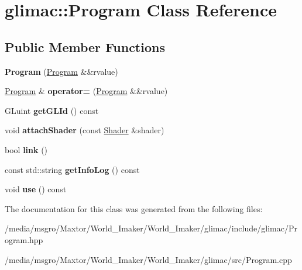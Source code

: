 \hypertarget{classglimac_1_1Program}{}\section{glimac\+:\+:Program Class Reference}
\label{classglimac_1_1Program}
\subsection*{Public Member Functions}
\begin{DoxyCompactItemize}
\item 
\mbox{\label{classglimac_1_1Program_aad59ed1f53824eda09b95fd1acdce674}} 
{\bfseries Program} (\hyperlink{classglimac_1_1Program}{Program} \&\&rvalue)
\item 
\mbox{\label{classglimac_1_1Program_a3ee1eac00a2e3fa4b6bab51d4333f33c}} 
\hyperlink{classglimac_1_1Program}{Program} \& {\bfseries operator=} (\hyperlink{classglimac_1_1Program}{Program} \&\&rvalue)
\item 
\mbox{\label{classglimac_1_1Program_ab1a519d005c77ba44876d1f309b38d18}} 
G\+Luint {\bfseries get\+G\+L\+Id} () const
\item 
\mbox{\label{classglimac_1_1Program_a5aac165d28cd6f704c01a3e0eee2119d}} 
void {\bfseries attach\+Shader} (const \hyperlink{classglimac_1_1Shader}{Shader} \&shader)
\item 
\mbox{\label{classglimac_1_1Program_a2f32f4f66ff9742750418f6fda054931}} 
bool {\bfseries link} ()
\item 
\mbox{\label{classglimac_1_1Program_aaf1769457ca41bca4afad7ecf90e9c3f}} 
const std\+::string {\bfseries get\+Info\+Log} () const
\item 
\mbox{\label{classglimac_1_1Program_a825cb4d58cccdf849730191ae5e118c6}} 
void {\bfseries use} () const
\end{DoxyCompactItemize}


The documentation for this class was generated from the following files\+:\begin{DoxyCompactItemize}
\item 
/media/msgro/\+Maxtor/\+World\+\_\+\+Imaker/\+World\+\_\+\+Imaker/glimac/include/glimac/Program.\+hpp\item 
/media/msgro/\+Maxtor/\+World\+\_\+\+Imaker/\+World\+\_\+\+Imaker/glimac/src/Program.\+cpp\end{DoxyCompactItemize}
